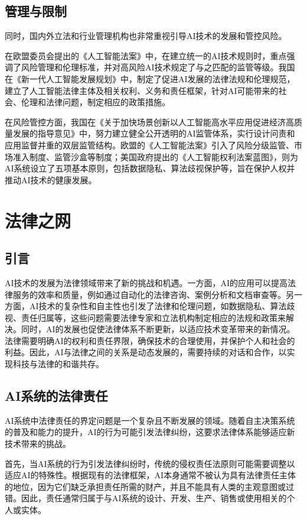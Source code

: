 \subsection{管理与限制}
同时，国内外立法和行业管理机构也非常重视引导AI技术的发展和管控风险。

在欧盟委员会提出的《人工智能法案》中，在建立统一的AI技术规则时，重点强调了风险管理和伦理标准，并对高风险AI技术规定了与之匹配的监管等级。我国在《新⼀代⼈⼯智能发展规划》中，制定了促进AI发展的法律法规和伦理规范，建立了人工智能法律主体及相关权利、义务和责任框架，针对AI可能带来的社会、伦理和法律问题，制定相应的政策措施。

在风险管控方面，我国在《关于加快场景创新以人工智能高水平应用促进经济高质量发展的指导意见》中，努力建立健全公开透明的AI监管体系，实行设计问责和应用监督并重的双层监管结构。欧盟的《人工智能法案》引入了风险分级监管、市场准入制度、监管沙盒等制度；美国政府提出的《人工智能权利法案蓝图》，则为AI系统设立了五项基本原则，包括数据隐私、算法歧视保护等，旨在保护人权并推动AI技术的健康发展。

\section{法律之网}

\subsection{引言}
AI技术的发展为法律领域带来了新的挑战和机遇。一方面，AI的应用可以提高法律服务的效率和质量，例如通过自动化的法律咨询、案例分析和文档审查等。另一方面，AI技术的复杂性和自主性也引发了法律和伦理问题，如数据隐私、算法歧视、责任归属等，这些问题需要法律专家和立法机构制定相应的法规和政策来解决。同时，AI的发展也促使法律体系不断更新，以适应技术变革带来的新情况。法律需要明确AI的权利和责任界限，确保技术的合理使用，并保护个人和社会的利益。因此，AI与法律之间的关系是动态发展的，需要持续的对话和合作，以实现科技与法律的和谐共存。

\subsection{AI系统的法律责任}

AI系统中法律责任的界定问题是一个复杂且不断发展的领域。随着自主决策系统的普及和能力的提升，AI的行为可能引发法律纠纷，这要求法律体系能够适应新技术带来的挑战。

首先，当AI系统的行为引发法律纠纷时，传统的侵权责任法原则可能需要调整以适应AI的特殊性。根据现有的法律框架，AI本身通常不被认为具有法律责任主体的地位，因为它们缺乏承担责任所需的财产，并且不能具有人类的主观意图或过错。因此，责任通常归属于与AI系统的设计、开发、生产、销售或使用相关的个人或实体。

